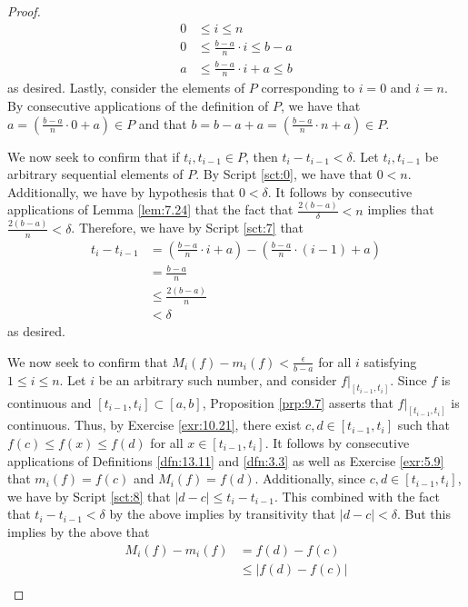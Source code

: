 \documentclass[../main.tex]{subfiles}
\begin{document}
\begin{theorem}
\begin{proof}
        \begin{align*}
            0 &\leq i \leq n\\
            0 &\leq \frac{b-a}{n}\cdot i \leq b-a\\
            a & \leq \frac{b-a}{n}\cdot i+a \leq b
        \end{align*}
        as desired. Lastly, consider the elements of $P$ corresponding to $i=0$ and $i=n$. By consecutive applications of the definition of $P$, we have that $a=(\frac{b-a}{n}\cdot 0+a)\in P$ and that $b=b-a+a=(\frac{b-a}{n}\cdot n+a)\in P$.\par
        We now seek to confirm that if $t_i,t_{i-1}\in P$, then $t_i-t_{i-1}<\delta$. Let $t_i,t_{i-1}$ be arbitrary sequential elements of $P$. By Script \ref{sct:0}, we have that $0<n$. Additionally, we have by hypothesis that $0<\delta$. It follows by consecutive applications of Lemma \ref{lem:7.24} that the fact that $\frac{2(b-a)}{\delta}<n$ implies that $\frac{2(b-a)}{n}<\delta$. Therefore, we have by Script \ref{sct:7} that
        \begin{align*}
            t_i-t_{i-1} &= \left( \frac{b-a}{n}\cdot i+a \right)-\left( \frac{b-a}{n}\cdot(i-1)+a \right)\\
            &= \frac{b-a}{n}\\
            &\leq \frac{2(b-a)}{n}\\
            &< \delta
        \end{align*}
        as desired.\par
        We now seek to confirm that $M_i(f)-m_i(f)<\frac{\epsilon}{b-a}$ for all $i$ satisfying $1\leq i\leq n$. Let $i$ be an arbitrary such number, and consider $f|_{[t_{i-1},t_i]}$. Since $f$ is continuous and $[t_{i-1},t_i]\subset[a,b]$, Proposition \ref{prp:9.7} asserts that $f|_{[t_{i-1},t_i]}$ is continuous. Thus, by Exercise \ref{exr:10.21}, there exist $c,d\in[t_{i-1},t_i]$ such that $f(c)\leq f(x)\leq f(d)$ for all $x\in[t_{i-1},t_i]$. It follows by consecutive applications of Definitions \ref{dfn:13.11} and \ref{dfn:3.3} as well as Exercise \ref{exr:5.9} that $m_i(f)=f(c)$ and $M_i(f)=f(d)$. Additionally, since $c,d\in[t_{i-1},t_i]$, we have by Script \ref{sct:8} that $|d-c|\leq t_i-t_{i-1}$. This combined with the fact that $t_i-t_{i-1}<\delta$ by the above implies by transitivity that $|d-c|<\delta$. But this implies by the above that
        \begin{align*}
            M_i(f)-m_i(f) &= f(d)-f(c)\\
            &\leq |f(d)-f(c)|\\

\end{align*}
\end{proof}
\end{theorem}
\end{document}
